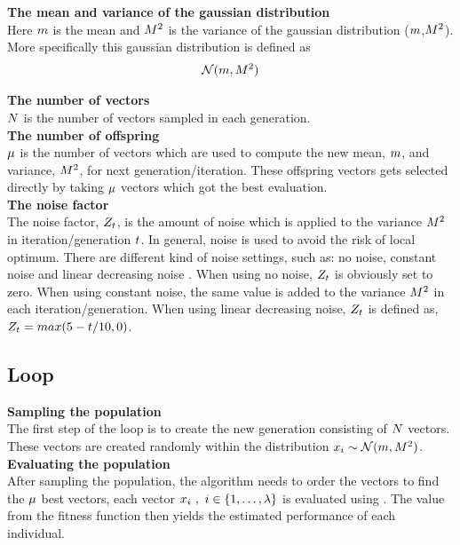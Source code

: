 \textbf{The mean and variance of the gaussian distribution} \\
Here $m$ is the mean and  $M^2$ is the variance 
of the gaussian distribution ($m$,$M^2$). 
More specifically this gaussian distribution is defined as 
\begin{align*}
\mathcal{N}(m,M^2)
\end{align*}

\textbf{The number of vectors}\\
$N$ is the number of vectors sampled in each generation.
\\

\textbf{The number of offspring}\\
$\mu$ is the number of vectors which are used to compute 
the new mean, $m$, and variance, $M^2$, for next generation/iteration. 
These offspring vectors gets selected directly by taking $\mu$ vectors
which got the best evaluation.
\\

\textbf{The noise factor}\\
The noise factor, $Z_{t}$, is the amount of noise which 
is applied to the variance $M^2$ in iteration/generation 
$t$. In general, noise is used to avoid the risk of local optimum.
There are different kind of noise settings, such as: no noise, constant noise 
and linear decreasing noise \citep{szita:06}. When using no noise, $Z_{t}$ 
is obviously set to zero. When using constant noise, the same value is 
added to the variance $M^2$ in each iteration/generation. 
When using linear decreasing noise, $Z_{t}$ is defined as, 
$Z_{t}=max(5- t /10,0)$.
\\

\subsection{Loop}

\textbf{Sampling the population}\\
The first step of the loop is to create the new generation consisting of $N$ vectors. These vectors are created randomly within the distribution $x_{i}\sim \mathcal{N}(m,M^2)$.
\\

\textbf{Evaluating the population}\\
After sampling the population, the algorithm needs to order the vectors to find the $\mu$ best vectors, each vector $x_{i}\ ,\ i \in \{1, \dots, \lambda\}$ is evaluated using \fitnessFunction. The value from the fitness function then yields the estimated performance of each individual.
\\

